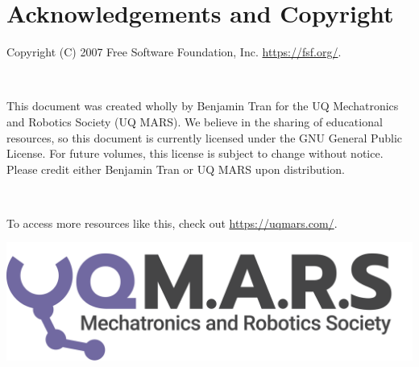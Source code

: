 \chapter{Acknowledgements and Copyright}

Copyright (C) 2007 Free Software Foundation, Inc. \url{https://fsf.org/}.

$ $

This document was created wholly by Benjamin Tran for the UQ Mechatronics and Robotics Society (UQ MARS). We believe in the sharing of educational resources, so this document is currently licensed under the GNU General Public License. For future volumes, this license is subject to change without notice. Please credit either Benjamin Tran or UQ MARS upon distribution.

$ $

To access more resources like this, check out \url{https://uqmars.com/}.

\begin{center}
    \vspace*{120mm}
    \includegraphics[width=0.7\paperwidth]{./assets/Logo (Dark).png} \\
    \vspace{1cm}
\end{center}
